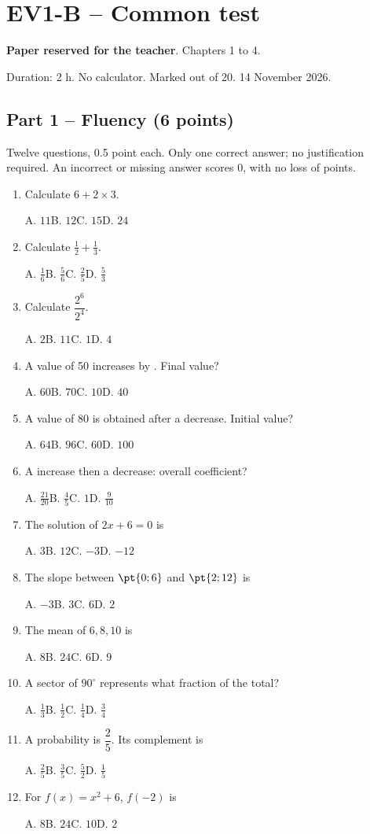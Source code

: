 \mxnewpage\section*{EV1-B -- Common test}\label{EV1-B}
\textbf{Paper reserved for the teacher}. Chapters 1 to 4.\par Duration: 2 h. No calculator. Marked out of 20. 14 November 2026.
\subsection*{Part 1 -- Fluency (6 points)}
Twelve questions, \num{0,5} point each. Only one correct answer; no justification required. An incorrect or missing answer scores 0, with no loss of points.
\begin{enumerate}
\item Calculate $6+2\times3$.\par A. $11$\quad B. $12$\quad C. $15$\quad D. $24$
\item Calculate $\frac12+\frac13$.\par A. $\frac{1}{6}$\quad B. $\frac{5}{6}$\quad C. $\frac{2}{5}$\quad D. $\frac{5}{3}$
\item Calculate $\dfrac{2^6}{2^{4}}$.\par A. $2$\quad B. $11$\quad C. $1$\quad D. $4$
\item A value of 50 increases by . Final value?\par A. $60$\quad B. $70$\quad C. $10$\quad D. $40$
\item A value of 80 is obtained after a  decrease. Initial value?\par A. $64$\quad B. $96$\quad C. $60$\quad D. $100$
\item A  increase then a  decrease: overall coefficient?\par A. $\frac{21}{20}$\quad B. $\frac{4}{5}$\quad C. $1$\quad D. $\frac{9}{10}$
\item The solution of $2x+6=0$ is\par A. $3$\quad B. $12$\quad C. $-3$\quad D. $-12$
\item The slope between $\pt{0;6}$ and $\pt{2;12}$ is\par A. $-3$\quad B. $3$\quad C. $6$\quad D. $2$
\item The mean of $6, 8, 10$ is\par A. $8$\quad B. $24$\quad C. $6$\quad D. $9$
\item A sector of $90^\circ$ represents what fraction of the total?\par A. $\frac{1}{3}$\quad B. $\frac{1}{2}$\quad C. $\frac{1}{4}$\quad D. $\frac{3}{4}$
\item A probability is $\dfrac{2}{5}$. Its complement is\par A. $\frac{2}{5}$\quad B. $\frac{3}{5}$\quad C. $\frac{5}{2}$\quad D. $\frac{1}{5}$
\item For $f(x)=x^2+6$, $f(-2)$ is\par A. $8$\quad B. $24$\quad C. $10$\quad D. $2$
\end{enumerate}
